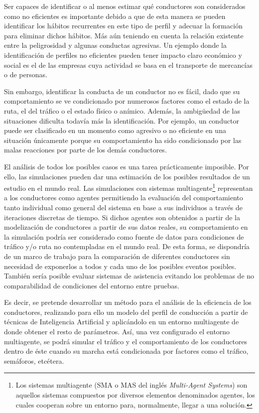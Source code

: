 Ser capaces de identificar o al menos estimar qué conductores son considerados como no eficientes es importante debido a que de esta manera se pueden identificar los hábitos recurrentes en este tipo de perfil y adecuar la formación para eliminar dichos hábitos. Más aún teniendo en cuenta la relación existente entre la peligrosidad y algunas conductas agresivas. Un ejemplo donde la identificación de perfiles no eficientes pueden tener impacto claro económico y social es el de las empresas cuya actividad se basa en el transporte de mercancías o de personas.

Sin embargo, identificar la conducta de un conductor no es fácil, dado que su comportamiento se ve condicionado por numerosos factores como el estado de la ruta, el del tráfico o el estado físico o anímico. Además, la ambigüedad de las situaciones dificulta todavía más la identificación. Por ejemplo, un conductor puede ser clasificado en un momento como agresivo o no eficiente en una situación únicamente porque su comportamiento ha sido condicionado por las malas reacciones por parte de los demás conductores.

El análisis de todos los posibles casos es una tarea prácticamente imposible. Por ello, las simulaciones pueden dar una estimación de los posibles resultados de un estudio en el mundo real. Las simulaciones con sistemas multiagente\footnote{Los sistemas multiagente (SMA o MAS del inglés \textit{Multi-Agent Systems}) son aquellos sistemas compuestos por diversos elementos denominados agentes, los cuales cooperan sobre un entorno para, normalmente, llegar a una solución.} representan a los conductores como agentes permitiendo la evaluación del comportamiento tanto individual como general del sistema en base a sus individuos a través de iteraciones discretas de tiempo. Si dichos agentes son obtenidos a partir de la modelización de conductores a partir de sus datos reales, su comportamiento en la simulación podría ser considerado como fuente de datos para condiciones de tráfico y/o ruta no contempladas en el mundo real. De esta forma, se dispondría de un marco de trabajo para la comparación de diferentes conductores sin necesidad de exponerlos a todos y cada uno de los posibles eventos posibles. También sería posible evaluar sistemas de asistencia evitando los problemas de no comparabilidad de condiciones del entorno entre pruebas.

Es decir, se pretende desarrollar un método para el análisis de la eficiencia de los conductores, realizando para ello un modelo del perfil de conducción a partir de técnicas de Inteligencia Artificial y aplicándolo en un entorno multiagente de donde obtener el resto de parámetros. Así, una vez configurado el entorno multiagente, se podrá simular el tráfico y el comportamiento de los conductores dentro de éste cuando su marcha está condicionada por factores como el tráfico, semáforos, etcétera.

